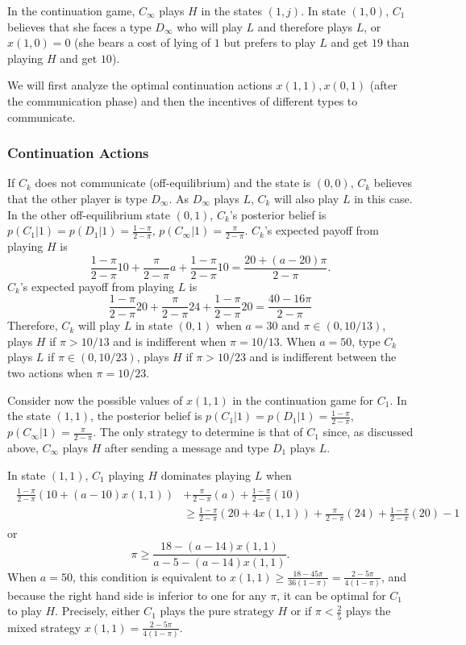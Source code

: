 \documentclass[12pt]{article}
\theoremstyle{definition}
\theoremstyle{remark}
\begin{document}
In the continuation game, $C_\infty$ plays $H$ in the states $(1,j)$. In state $(1,0)$, $C_1$ believes that she faces a type $D_\infty$ who will play $L$ and therefore plays $L$, or $x(1,0)=0$ (she bears a cost of lying of $1$ but prefers to play $L$ and get $19$ than playing $H$ and get $10$). 

We will first analyze the optimal continuation actions $x(1,1),x(0,1)$ (after the communication phase) and then the incentives of different types to communicate.

\subsubsection*{Continuation Actions}
If $C_k$ does not communicate (off-equilibrium) and the state is $(0,0)$, $C_k$ believes that the other player is type $D_\infty$. As $D_\infty$ plays $L$, $C_k$ will also play $L$ in this case. In the other off-equilibrium state $(0,1)$, $C_k$'s posterior belief is $p(C_1|1)=p(D_1|1)=\frac{1-\pi}{2-\pi}$, $p(C_\infty|1)=\frac{\pi}{2-\pi}$. $C_k$'s expected payoff from playing $H$ is
\[
\frac{1-\pi}{2-\pi} 10 +\frac{\pi}{2-\pi} a + \frac{1-\pi}{2-\pi} 10 = \frac{20+(a-20)\pi}{2-\pi}.
\]
$C_k$'s expected payoff from playing $L$ is
\[
\frac{1-\pi}{2-\pi} 20+\frac{\pi}{2-\pi} 24 + \frac{1-\pi}{2-\pi} 20 = \frac{40-16\pi}{2-\pi}
\]
Therefore, $C_k$ will  play $L$ in state $(0,1)$ when $a=30$ and $\pi \in (0, 10/13)$, plays $H$ if $\pi > 10/13$ and is indifferent when $\pi = 10/13$. When $a=50$,  type $C_k$ plays $L$ if $\pi \in (0, 10/23)$, plays $H$ if $\pi >10/23$ and is indifferent between the two actions when $\pi = 10/23$.

Consider now the possible values of $x(1,1)$ in the continuation game for $C_1$. In the state $(1,1)$, the posterior belief is $p(C_1|1)=p(D_1|1)=\frac{1-\pi}{2-\pi}$, $p(C_\infty|1)=\frac{\pi}{2-\pi}$. The only strategy to determine is that of $C_1$ since, as discussed above, $C_\infty$ plays $H$ after sending a message and type $D_1$ plays $L$.

In state $(1,1)$, $C_1$ playing $H$ dominates playing $L$ when
\begin{align*}
\begin{split}
	\frac{1-\pi}{2-\pi}(10+(a-10)x(1,1))&+\frac{\pi}{2-\pi}(a)+\frac{1-\pi}{2-\pi}(10)\\
	&\geq \frac{1-\pi}{2-\pi}(20+4x(1,1))+\frac{\pi}{2-\pi}(24)+\frac{1-\pi}{2-\pi}(20)-1
\end{split}
\end{align*}
or
\[
\pi\geq \frac{18-(a-14)x(1,1)}{a-5-(a-14)x(1,1)}.
\]
When $a=50$, this condition is equivalent to $x(1,1)\geq \frac{18-45\pi}{36(1-\pi)}=\frac{2-5\pi}{4(1-\pi)}$, and because the right hand side is inferior to one for any $\pi$, it can be optimal for $C_1$ to play $H$. Precisely, either $C_1$ plays the pure strategy $H$ or if $\pi<\frac{2}{5}$ plays the mixed strategy $x(1,1)=\frac{2-5\pi}{4(1-\pi)}$. 
\end{document}
